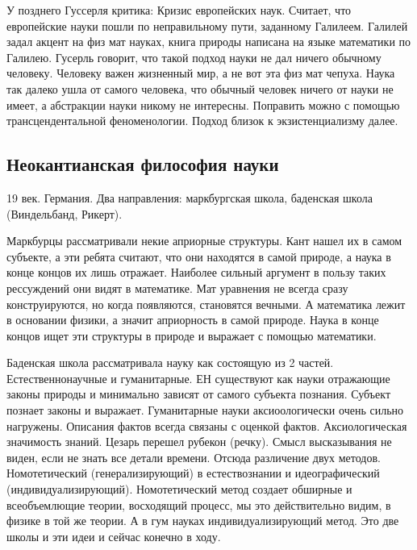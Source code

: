 \documentclass[a4paper, 12pt]{article}
\begin{document}
У позднего Гуссерля критика: Кризис европейских наук. Считает, что 
европейские науки пошли по неправильному пути, заданному Галилеем. 
Галилей задал акцент на физ мат науках, книга природы написана на языке 
математики по Галилею. Гусерль говорит, что такой подход науки не дал 
ничего обычному человеку. Человеку важен жизненный мир, а не вот эта физ 
мат чепуха. Наука так далеко ушла от самого человека, что обычный 
человек ничего от науки не имеет, а абстракции науки никому не 
интересны. Поправить можно с помощью трансцендентальной феноменологии. 
Подход близок к экзистенциализму далее.

\subsection{Неокантианская философия науки}
19 век. Германия. Два направления: маркбургская школа, баденская школа 
(Виндельбанд, Рикерт).

Маркбурцы рассматривали некие априорные структуры. Кант нашел их в самом 
субъекте, а эти ребята считают, что они находятся в самой природе, 
а наука в конце концов их лишь отражает. Наиболее сильный аргумент 
в пользу таких рессуждений они видят в математике. Мат уравнения не 
всегда сразу конструируются, но когда появляются, становятся вечными. 
А математика лежит в основании физики, а значит априорность в самой 
природе. Наука в конце концов ищет эти структуры в природе и выражает 
с помощью математики.

Баденская школа рассматривала науку как состоящую из 2 частей. 
Естественнонаучные и гуманитарные. ЕН существуют как науки отражающие 
законы природы и минимально зависят от самого субъекта познания. Субъект 
познает законы и выражает. Гуманитарные науки аксиоологически очень 
сильно нагружены. Описания фактов всегда связаны с оценкой фактов. 
Аксиологическая значимость знаний. Цезарь перешел рубекон (речку). Смысл 
высказывания не виден, если не знать все детали времени. Отсюда 
различение двух методов. Номотетический (генерализирующий) 
в естествознании и идеографический (индивидуализирующий). Номотетический 
метод создает обширные и всеобъемлющие теории, восходящий процесс, мы 
это действительно видим, в физике в той же теории. А в гум науках 
индивидуализирующий метод. Это две школы и эти идеи и сейчас конечно 
в ходу.
\end{document}
